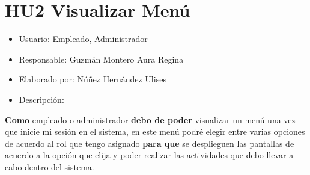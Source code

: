 \section{HU2 Visualizar Menú}
\begin{itemize}
	\item Usuario: Empleado, Administrador
	\item Responsable: Guzmán Montero Aura Regina
	\item Elaborado por: Núñez Hernández Ulises
	\item Descripción:\\
\end{itemize}

\textbf{Como} empleado o administrador \textbf{debo de poder} visualizar un menú una vez que inicie mi sesión en el sistema, en este menú podré elegir entre varias opciones de acuerdo al rol que tengo asignado \textbf{para que} se desplieguen las pantallas de acuerdo a la opción que elija y poder realizar las actividades que debo llevar a cabo dentro del sistema.